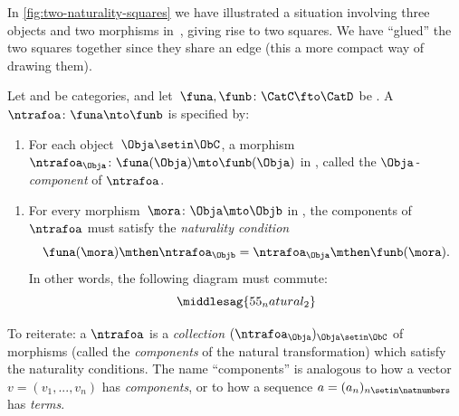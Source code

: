 In \cref{fig:two-naturality-squares} we have illustrated a situation involving three objects and two morphisms in~\CatC, giving rise to two squares.
We have ``glued'' the two squares together since they share an edge (this a more compact way of drawing them).


\begin{ctdefinition}
    \label{def:natural-transformation}
    Let \CatC and \CatD be categories, and let~$\funa,\funb\colon \CatC\fto \CatD$ be .
    A ~$\ntrafoa \colon \funa \nto \funb$ is specified by:

    \constit
    \begin{enumerate}
        \item For each object~$\Obja\setin \ObC$, a morphism $\ntrafoa_\Obja \colon \funa(\Obja)\mto \funb(\Obja)$ in \CatD, called the $\Obja$\emph{-component} of $\ntrafoa$.
    \end{enumerate}
    \condit
    \begin{enumerate}
        \item For every morphism~$\mora\colon \Obja\mto \Objb$ in \CatC, the components of $\ntrafoa$ must satisfy the \emph{naturality condition}
              \begin{equation}
                  \funa(\mora)\mthen \ntrafoa_\Objb = \ntrafoa_\Obja\mthen \funb(\mora).
              \end{equation}
              In other words, the following diagram must commute:
              \begin{equation}
                  \label{eq:def-naturality-square}
                  \middlesag{55_natural_2}
              \end{equation}
    \end{enumerate}
\end{ctdefinition}

To reiterate: a  $\ntrafoa$ is a \emph{collection} $(\ntrafoa_\Obja)_{\Obja \setin \ObC}$ of morphisms (called the \emph{components} of the natural transformation) which satisfy the naturality conditions.
The name ``components'' is analogous to how a vector $v = (v_1, .
    .., v_n)$ has \emph{components}, or to how a sequence $a = (a_n)_{n \setin \natnumbers}$ has \emph{terms}.


